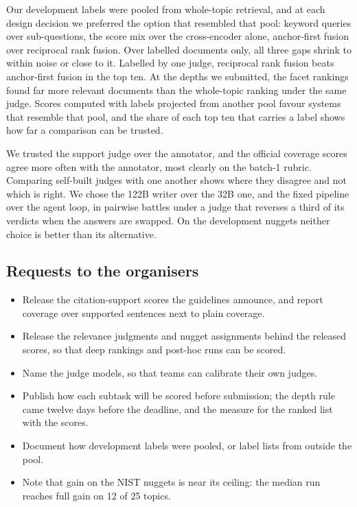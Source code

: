 \documentclass[sigconf,nonacm]{acmart}
\begin{document}
Our development labels were pooled from whole-topic retrieval, and at each design
decision we preferred the option that resembled that pool: keyword queries over
sub-questions, the score mix over the cross-encoder alone, anchor-first fusion over
reciprocal rank fusion. Over labelled documents only, all three gaps shrink to
within noise or close to it. Labelled by one judge, reciprocal rank fusion beats
anchor-first fusion in the top ten. At the depths we submitted, the facet rankings
found far more relevant documents than the whole-topic ranking under the same judge.
Scores computed with labels projected from
another pool favour systems that resemble that pool, and the share of each top ten
that carries a label shows how far a comparison can be trusted.

We trusted the support judge over the annotator, and the official coverage scores
agree more often with the annotator, most clearly on the batch-1 rubric. Comparing
self-built judges with one another shows where they disagree and not which is right.
We chose the 122B writer over the 32B one, and the fixed pipeline over the agent loop,
in pairwise battles under a judge that reverses a third of its verdicts when the
answers are swapped. On the development nuggets neither choice is better than its
alternative.

\subsection{Requests to the organisers}
\begin{itemize}\setlength{\itemsep}{1pt}
\item Release the citation-support scores the guidelines announce, and report
coverage over supported sentences next to plain coverage.
\item Release the relevance judgments and nugget assignments behind the released
scores, so that deep rankings and post-hoc runs can be scored.
\item Name the judge models, so that teams can calibrate their own judges.
\item Publish how each subtask will be scored before submission; the depth rule
came twelve days before the deadline, and the measure for the ranked list with the
scores.
\item Document how development labels were pooled, or label lists from outside the
pool.
\item Note that gain on the NIST nuggets is near its ceiling: the median run reaches
full gain on 12 of 25 topics.
\end{itemize}
\end{document}

